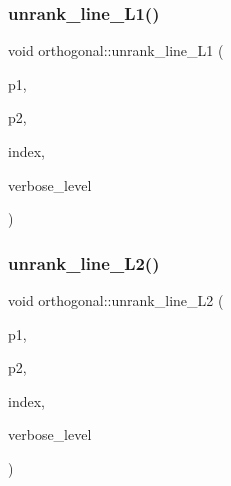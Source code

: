 \subsubsection{\texorpdfstring{unrank\+\_\+line\+\_\+\+L1()}{unrank\_line\_L1()}}
{\footnotesize\ttfamily void orthogonal\+::unrank\+\_\+line\+\_\+\+L1 (\begin{DoxyParamCaption}\item[{\mbox{\hyperlink{galois_8h_a09fddde158a3a20bd2dcadb609de11dc}{I\+NT}} \&}]{p1,  }\item[{\mbox{\hyperlink{galois_8h_a09fddde158a3a20bd2dcadb609de11dc}{I\+NT}} \&}]{p2,  }\item[{\mbox{\hyperlink{galois_8h_a09fddde158a3a20bd2dcadb609de11dc}{I\+NT}}}]{index,  }\item[{\mbox{\hyperlink{galois_8h_a09fddde158a3a20bd2dcadb609de11dc}{I\+NT}}}]{verbose\+\_\+level }\end{DoxyParamCaption})}

\mbox{\label{classorthogonal_abb7883ab6e8726606f8b82094d1181a5}} 
\subsubsection{\texorpdfstring{unrank\+\_\+line\+\_\+\+L2()}{unrank\_line\_L2()}}
{\footnotesize\ttfamily void orthogonal\+::unrank\+\_\+line\+\_\+\+L2 (\begin{DoxyParamCaption}\item[{\mbox{\hyperlink{galois_8h_a09fddde158a3a20bd2dcadb609de11dc}{I\+NT}} \&}]{p1,  }\item[{\mbox{\hyperlink{galois_8h_a09fddde158a3a20bd2dcadb609de11dc}{I\+NT}} \&}]{p2,  }\item[{\mbox{\hyperlink{galois_8h_a09fddde158a3a20bd2dcadb609de11dc}{I\+NT}}}]{index,  }\item[{\mbox{\hyperlink{galois_8h_a09fddde158a3a20bd2dcadb609de11dc}{I\+NT}}}]{verbose\+\_\+level }\end{DoxyParamCaption})}

\mbox{\label{classorthogonal_a3546eded4c93131b31df43de26a08991}} 
